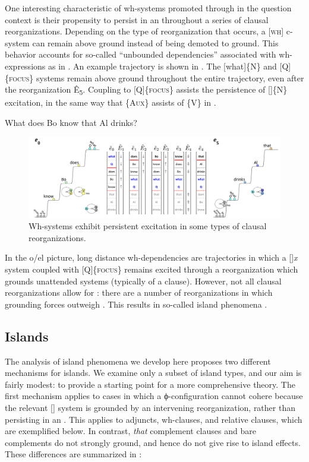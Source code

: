   One interesting characteristic of wh-systems promoted through  in the question context is their propensity to persist in an  throughout a series of clausal reorganizations. Depending on the type of reorganization that occurs, a [\textsc{wh}] c-system can remain above ground instead of being demoted to ground. This behavior accounts for so-called “unbounded dependencies” associated with wh-expressions as in . An example trajectory is shown in {}. The [what]\{N\} and [Q]\{\textsc{focus}\} systems remain above ground throughout the entire trajectory, even after the  reorganization Ê\textsubscript{5}. Coupling to [Q]\{\textsc{focus}\} assists the persistence of []\{N\} excitation, in the same way that \{A\textsc{ux}\} assists  of \{V\} in . 

  \ea\label{ex:7:20}
    {What does Bo know that Al drinks?}
\z
  
\begin{figure}
\includegraphics[width=\textwidth]{figures/Tilsen-img162.png}
\caption{Wh-systems exhibit persistent excitation in some types of clausal reorganizations.}
\label{fig:7:18}
\end{figure}
 

  In the o/el picture, long distance wh-dependencies are trajectories in which a []{\textit{x}} system coupled with [Q]\{\textsc{focus}\} remains excited through a reorganization which grounds unattended systems (typically of a clause). However, not all clausal reorganizations allow for : there are a number of reorganizations in which grounding forces outweigh . This results in so-called island phenomena \citep{Ross1967}.

\subsection{Islands}

The analysis of island phenomena we develop here proposes two different mechanisms for islands. We examine only a subset of island types, and our aim is fairly modest: to provide a starting point for a more comprehensive theory. The first mechanism applies to cases in which a ϕ-configuration cannot cohere because the relevant [] system is grounded by an intervening reorganization, rather than persisting in an . This applies to adjuncts, wh-clauses, and relative clauses, which are exemplified below. In contrast, \textit{that} complement clauses and bare complements do not strongly ground, and hence do not give rise to island effects. These differences are summarized in {}:

